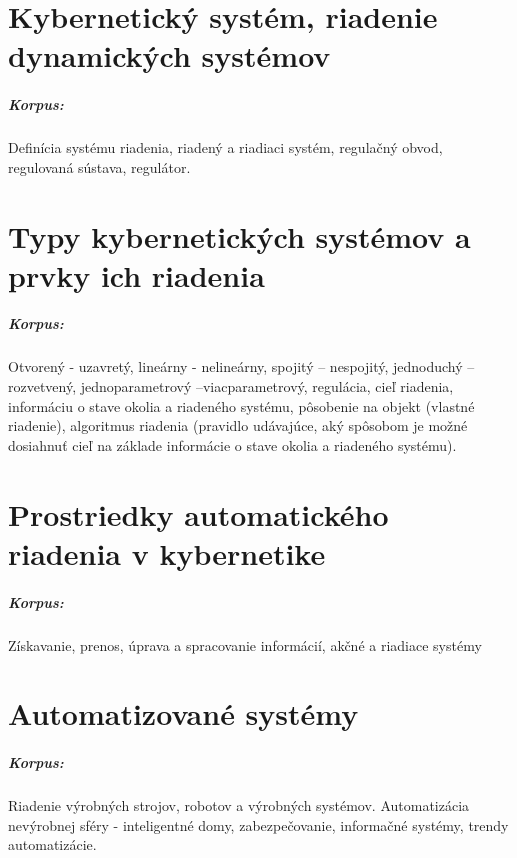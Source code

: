 \documentclass[11pt,a4paper]{report}
\begin{document}
\chapter{Kybernetický systém, riadenie dynamických systémov}

\paragraph{Korpus:} Definícia systému riadenia, riadený a riadiaci systém, regulačný obvod, regulovaná sústava, regulátor.

\chapter{Typy kybernetických systémov a prvky ich riadenia}

\paragraph{Korpus:} Otvorený - uzavretý, lineárny - nelineárny, spojitý – nespojitý, jednoduchý – rozvetvený, jednoparametrový –viacparametrový, regulácia, cieľ riadenia, informáciu o stave okolia a riadeného systému, pôsobenie na objekt (vlastné riadenie), algoritmus riadenia (pravidlo udávajúce, aký spôsobom je možné dosiahnuť cieľ na základe informácie o stave okolia a riadeného systému).

\chapter{Prostriedky automatického riadenia v kybernetike}

\paragraph{Korpus:} Získavanie, prenos, úprava a spracovanie informácií, akčné a riadiace systémy

\chapter{Automatizované systémy}

\paragraph{Korpus:} Riadenie výrobných strojov, robotov a výrobných systémov. Automatizácia nevýrobnej sféry - inteligentné domy, zabezpečovanie, informačné systémy, trendy automatizácie. 
\end{document}
